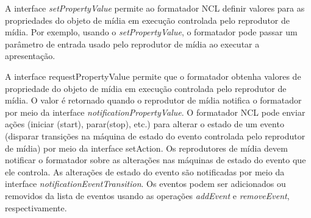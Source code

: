 A interface \textit{setPropertyValue} permite ao formatador NCL definir valores para as propriedades do objeto de mídia em execução controlada pelo reprodutor de mídia. Por exemplo, usando o \textit{setPropertyValue}, o formatador pode passar um parâmetro de entrada usado pelo reprodutor de mídia ao executar a apresentação. 

A interface requestPropertyValue permite que o formatador obtenha valores de propriedade do objeto de mídia em execução controlada pelo reprodutor de mídia. O valor é retornado quando o reprodutor de mídia notifica o formatador por meio da interface \textit{notificationPropertyValue}. O formatador NCL pode enviar ações (iniciar (start), parar(stop), etc.) para alterar o estado de um evento (disparar transições na máquina de estado do evento controlada pelo reprodutor de mídia) por meio da interface setAction. Os reprodutores de mídia devem notificar o formatador sobre as alterações nas máquinas de estado do evento que ele controla. As alterações de estado do evento são notificadas por meio da interface \textit{notificationEventTransition}. Os eventos podem ser adicionados ou removidos da lista de eventos usando as operações \textit{addEvent} e \textit{removeEvent}, respectivamente.





